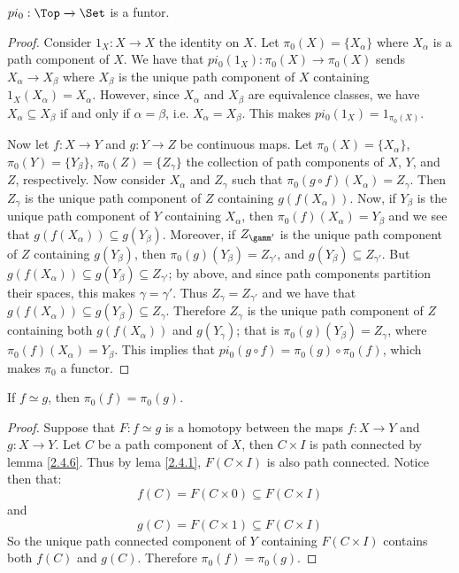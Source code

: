 \begin{theorem}\label{2.4.9}
    $pi_0:\Top \xrightarrow{} \Set$ is a funtor.
\end{theorem}
\begin{proof}
    Consider $1_X:X \xrightarrow{} X$ the identity on $X$. Let
    $\pi_0(X)=\{X_\alpha\}$ where $X_\alpha$ is a path component of $X$. We have
    that $pi_0(1_X):\pi_0(X) \xrightarrow{} \pi_0(X)$ sends $X_\alpha
    \xrightarrow{} X_\beta$ where $X_\beta$ is the unique path component of  $X$
    containing  $1_X(X_\alpha)=X_\alpha$. However, since $X_\alpha$ and
    $X_\beta$ are equivalence classes, we have  $X_\alpha \subseteq X_\beta$ if
    and only if  $\alpha=\beta$, i.e.  $X_\alpha=X_\beta$. This makes
    $pi_0(1_X)=1_{\pi_0(X)}$.

    Now let $f:X \xrightarrow{} Y$ and $g:Y \xrightarrow{} Z$ be continuous
    maps. Let $\pi_0(X)=\{X_\alpha\}$, $\pi_0(Y)=\{Y_\beta\}$, $\pi_0(Z)=
    \{Z_\gamma\}$ the collection of path components of $X$,  $Y$, and  $Z$,
    respectively. Now consider  $X_\alpha$ and  $Z_\gamma$ such that  $\pi_0(g
    \circ f)(X_\alpha)=Z_\gamma$. Then $Z_\gamma$ is the unique path component
    of  $Z$ containing  $g(f(X_\alpha))$. Now, if $Y_\beta$ is the unique path
    component of $Y$ containing $X_\alpha$, then $\pi_0(f)(X_\alpha)=Y_\beta$
    and we see that  $g(f(X_\alpha)) \subseteq g(Y_\beta)$. Moreover, if
    $Z_{\gamm'}$ is the unique path component of $Z$ containing  $g(Y_\beta)$,
    then $\pi_0(g)(Y_\beta)=Z_{\gamma'}$, and $g(Y_\beta) \subseteq
    Z_{\gamma'}$. But $g(f(X_\alpha)) \subseteq g(Y_\beta) \subseteq
    Z_{\gamma'}$; by above, and since path components partition their spaces,
    this makes $\gamma=\gamma'$. Thus  $Z_\gamma=Z_{\gamma'}$ and we have that
    $g(f(X_\alpha)) \subseteq g(Y_\beta) \subseteq Z_\gamma$. Therefore $Z_\gamma$
    is the unique path component of $Z$ containing both  $g(f(X_\alpha))$ and
    $g(Y_\gamma)$; that is $\pi_0(g)(Y_\beta)=Z_\gamma$, where
    $\pi_0(f)(X_\alpha)=Y_\beta$. This implies that $pi_0(g \circ f)=\pi_0(g)
    \circ \pi_0(f)$, which makes $\pi_0$ a functor.
\end{proof}
\begin{corollary}
    If $f \simeq g$, then  $\pi_0(f)=\pi_0(g)$.
\end{corollary}
\begin{proof}
    Suppose that $F:f \simeq g$ is a homotopy between the maps  $f:X
    \xrightarrow{} Y$ and $g:X \xrightarrow{} Y$. Let $C$ be a path component of
     $X$, then $C \times I$ is path connected by lemma \ref{2.4.6}. Thus by lema
     \ref{2.4.1}, $F(C \times I)$ is also path connected. Notice then that:
     \begin{equation*}
         f(C)=F(C \times 0) \subseteq F(C \times I)
     \end{equation*}
     and
     \begin{equation*}
         g(C)=F(C \times 1) \subseteq F(C \times I)
     \end{equation*}
     So the unique path connected component of $Y$ containing $F(C \times I)$
     contains both  $f(C)$ and $g(C)$. Therefore $\pi_0(f)=\pi_0(g)$.
\end{proof}
